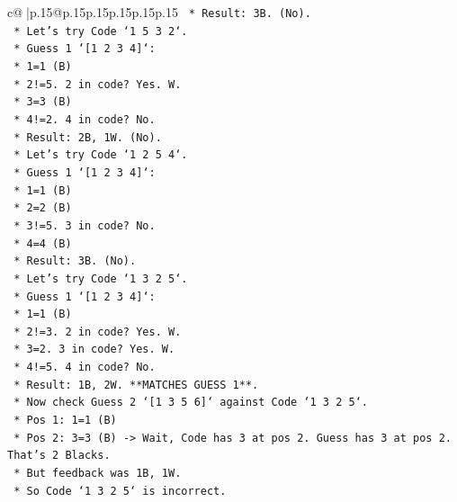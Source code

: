 \documentclass{article}
\begin{document}
{\begin{supertabular}{c@{$\;$}|p{.15\linewidth}@{}p{.15\linewidth}p{.15\linewidth}p{.15\linewidth}p{.15\linewidth}p{.15\linewidth}}
{{{\texttt{                    *   Result: 3B. (No).} \\
\texttt{            *   Let's try Code `1 5 3 2`.} \\
\texttt{                *   Guess 1 `{[}1 2 3 4{]}`:} \\
\texttt{                    *   1=1 (B)} \\
\texttt{                    *   2!=5. 2 in code? Yes. W.} \\
\texttt{                    *   3=3 (B)} \\
\texttt{                    *   4!=2. 4 in code? No.} \\
\texttt{                    *   Result: 2B, 1W. (No).} \\
\texttt{            *   Let's try Code `1 2 5 4`.} \\
\texttt{                *   Guess 1 `{[}1 2 3 4{]}`:} \\
\texttt{                    *   1=1 (B)} \\
\texttt{                    *   2=2 (B)} \\
\texttt{                    *   3!=5. 3 in code? No.} \\
\texttt{                    *   4=4 (B)} \\
\texttt{                    *   Result: 3B. (No).} \\
\texttt{            *   Let's try Code `1 3 2 5`.} \\
\texttt{                *   Guess 1 `{[}1 2 3 4{]}`:} \\
\texttt{                    *   1=1 (B)} \\
\texttt{                    *   2!=3. 2 in code? Yes. W.} \\
\texttt{                    *   3=2. 3 in code? Yes. W.} \\
\texttt{                    *   4!=5. 4 in code? No.} \\
\texttt{                    *   Result: 1B, 2W. **MATCHES GUESS 1**.} \\
\texttt{                *   Now check Guess 2 `{[}1 3 5 6{]}` against Code `1 3 2 5`.} \\
\texttt{                    *   Pos 1: 1=1 (B)} \\
\texttt{                    *   Pos 2: 3=3 (B) {-}> Wait, Code has 3 at pos 2. Guess has 3 at pos 2. That's 2 Blacks.} \\
\texttt{                    *   But feedback was 1B, 1W.} \\
\texttt{                    *   So Code `1 3 2 5` is incorrect.} \\
}}}
\end{supertabular}}
\end{document}
